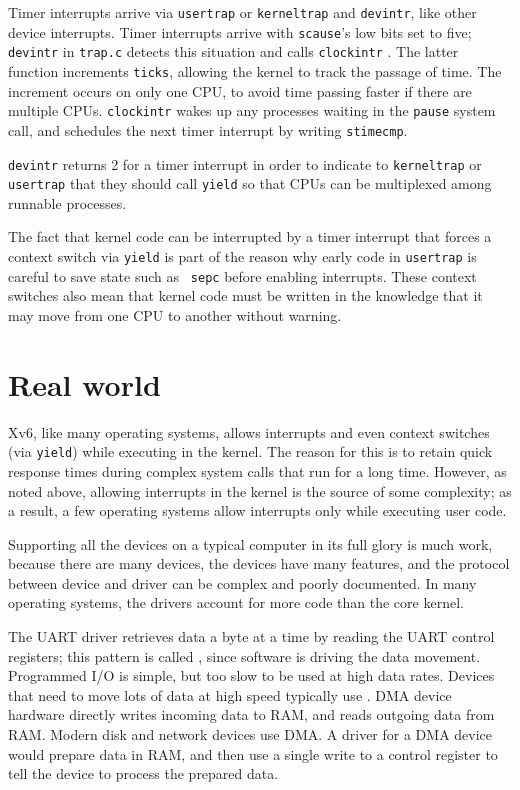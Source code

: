 Timer interrupts arrive via {\tt usertrap} or {\tt kerneltrap}
and {\tt devintr}, like other device interrupts.
Timer interrupts arrive with {\tt scause}'s low bits set to
five; {\tt devintr} in {\tt trap.c} detects this situation
and calls {\tt clockintr}
.
The latter function increments {\tt ticks},
allowing the kernel to track the
passage of time. The increment occurs on only one CPU, to avoid time
passing faster if there are multiple CPUs.
{\tt clockintr} wakes up any processes waiting in the {\tt pause}
system call,
and schedules the next timer interrupt by writing
{\tt stimecmp}.

{\tt devintr} returns 2 for a timer interrupt
in order to indicate to {\tt kerneltrap}
or {\tt usertrap} that they should call {\tt yield} so that
CPUs can be multiplexed among runnable processes.

The fact that kernel code can be interrupted by a timer interrupt that
forces a context switch via {\tt yield} is part of the reason why
early code in {\tt usertrap} is careful to save state such as {\tt
  sepc} before enabling interrupts. These context switches also mean
that kernel code must be written in the knowledge that it may move
from one CPU to another without warning.

\section{Real world}

Xv6, like many operating systems, allows interrupts and even context
switches (via {\tt yield}) while executing in the kernel. The reason
for this is to retain quick response times during complex system calls
that run for a long time. However, as noted above, allowing interrupts
in the kernel is the source of some complexity; as a result, a few
operating systems allow interrupts only while executing user code.

Supporting all the devices on a typical computer in its full glory is
much work, because there are many devices, the devices have many
features, and the protocol between device and driver can be complex
and poorly documented. In many operating systems, the drivers account
for more code than the core kernel.

The UART driver retrieves data a byte at a time by reading the UART
control registers; this pattern is called , since
software is driving the data movement. Programmed I/O is simple, but
too slow to be used at high data rates. Devices that need to move lots
of data at high speed typically use .
DMA device hardware directly writes incoming data to RAM, and reads
outgoing data from RAM. Modern disk and network devices use DMA. A
driver for a DMA device would prepare data in RAM, and then use a
single write to a control register to tell the device to process the
prepared data.

